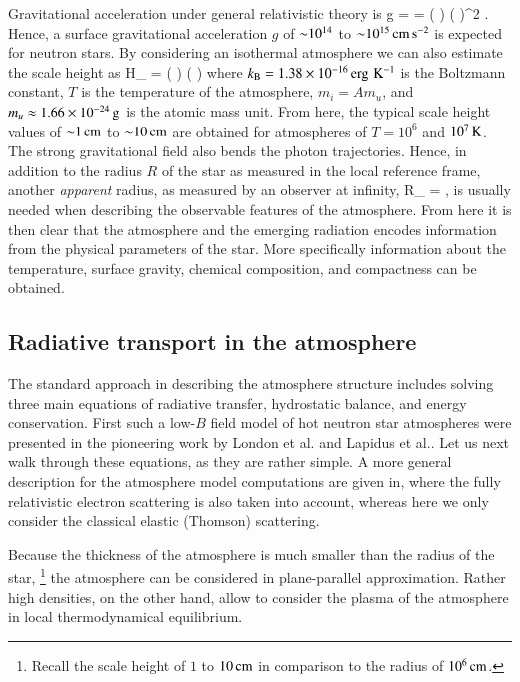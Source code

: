 Gravitational acceleration under general relativistic theory is
\be
g =   =   \left(  \right) \left(  \right)^2 \cmss.
\ee
Hence, a surface gravitational acceleration $g$ of $\mathord{\sim} 10^{14}$ to $\mathord{\sim} 10^{15}\, \mathrm{cm}\,\mathrm{s}^{-2}$ is expected for neutron stars.
By considering an isothermal atmosphere we can also estimate the scale height as
\be
H_{} =  \approx {} \left(  \right) \left(  \right) \cm
\ee
where $k_{\mathrm{B}} = 1.38 \times 10^{-16} \, \mathrm{erg} \, \, \mathrm{K}^{-1}$ is the Boltzmann constant, $T$ is the temperature of the atmosphere, $m_i = A m_u$, and $m_u \approx 1.66 \times 10^{-24}\, \mathrm{g}$ is the atomic mass unit.
From here, the typical scale height values of $\mathord{\sim} 1\, \mathrm{cm}$ to $\mathord{\sim} 10\, \mathrm{cm}$ are obtained for atmospheres of $T=10^6$ and $10^7\, \mathrm{K}$.\cite{ZP02, Potekhin14}
The strong gravitational field also bends the photon trajectories.\cite[see e.g.,][]{PFC83}
Hence, in addition to the radius $R$ of the star as measured in the local reference frame, another \emph{apparent} radius, as measured by an observer at infinity, 
\be
R_{\infty} = ,
\ee
is usually needed when describing the observable features of the atmosphere.
From here it is then clear that the atmosphere and the emerging radiation encodes information from the physical parameters of the star.
More specifically information about the temperature, surface gravity, chemical composition, and compactness can be obtained.

\subsection{Radiative transport in the atmosphere}
The standard approach in describing the atmosphere structure includes solving three main equations of radiative transfer, hydrostatic balance, and energy conservation.
First such a low-$B$ field model of hot neutron star atmospheres were presented in the pioneering work by London et al.\cite{London84,London86} and Lapidus et al.\cite{Lapidus85}.
Let us next walk through these equations, as they are rather simple.
A more general description for the atmosphere model computations are given in\cite{SPW12,NSK15}, where the fully relativistic electron scattering is also taken into account, whereas here we only consider the classical elastic (Thomson) scattering.

Because the thickness of the atmosphere is much smaller than the radius of the star,%
\footnote{Recall the scale height of $1$ to $10\, \mathrm{cm}$ in comparison to the radius of $10^6\, \mathrm{cm}$.}
the atmosphere can be considered in plane-parallel approximation.
Rather high densities, on the other hand, allow to consider the plasma of the atmosphere in local thermodynamical equilibrium.

